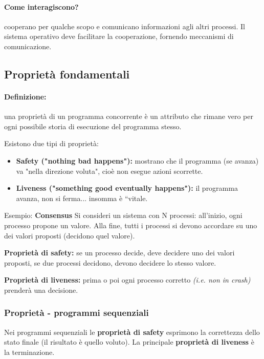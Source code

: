 \paragraph{Come interagiscono?} cooperano per qualche scopo e comunicano informazioni agli altri processi.
Il sistema operativo deve facilitare la cooperazione, fornendo meccanismi di comunicazione.

\subsection{Proprietà fondamentali}
\paragraph{Definizione:}una proprietà di un programma concorrente è un attributo che rimane vero per ogni possibile storia di esecuzione del programma stesso.

Esistono due tipi di proprietà:
\begin{itemize}
    \item \textbf{Safety ("nothing bad happens"): }mostrano che il programma (se avanza) va "nella direzione voluta", cioè
non esegue azioni scorrette.
    \item \textbf{Liveness ("something good eventually happens"): }il programma avanza, non si ferma... insomma è “vitale.
\end{itemize}

Esempio: \textbf{Consensus }
\newline
Si consideri un sistema con N processi: all'inizio, ogni processo propone un valore. Alla fine, tutti i processi si devono accordare su uno dei valori proposti (decidono quel valore).
\newline

\textbf{Proprietà di safety: }se un processo decide, deve decidere uno dei valori proposti, se due processi decidono, devono decidere lo stesso valore.
\newline

\textbf{Proprietà di liveness: } prima o poi ogni processo corretto \textit{(i.e. non in crash)} prenderà una decisione.

\subsubsection{Proprietà - programmi sequenziali}
Nei programmi sequenziali le \textbf{proprietà di safety} esprimono la correttezza dello stato finale (il risultato è quello voluto).
La principale \textbf{proprietà di liveness} è la terminazione.

